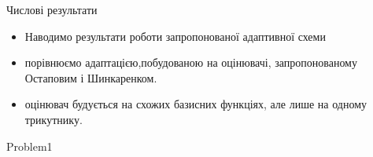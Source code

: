 
\begin{frame}{Числові результати}
	\begin{itemize}
		\item Наводимо результати роботи запропонованої адаптивної схеми
		\item порівнюємо адаптацією,побудованою на оцінювачі, запропонованому Остаповим і Шинкаренком.
		\item оцінювач будується на схожих базисних функціях, але лише на одному трикутнику.
	\end{itemize}
\end{frame}

{Problem1}
